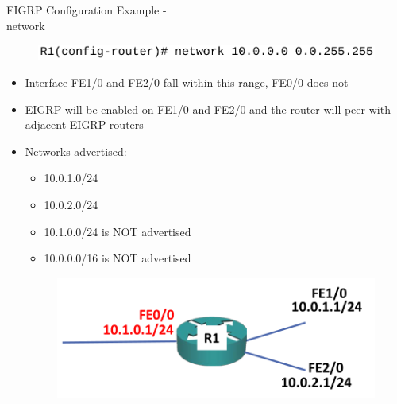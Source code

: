 \documentclass[pdflatex,compress,mathserif]{beamer}
\begin{document}
\begin{frame}{EIGRP Configuration Example -\\ network}
	\begin{figure}
		\centering
		\includegraphics[width=\linewidth]{img/img16}
	\end{figure}
	\begin{itemize}
		\item Interface FE1/0 and FE2/0 fall within this range, FE0/0 does not
		\item EIGRP will be enabled on FE1/0 and FE2/0 and the router will peer with
adjacent EIGRP routers
		\item Networks advertised:
		\begin{multicols}{2}
			\begin{itemize}
				\item 10.0.1.0/24
				\item 10.0.2.0/24
				\item 10.1.0.0/24 is NOT advertised
				\item 10.0.0.0/16 is NOT advertised
			\end{itemize}
			\columnbreak
			\begin{figure}
				\centering
				\includegraphics[width=\linewidth]{img/img17}
			\end{figure}
		\end{multicols}
	\end{itemize}
\end{frame}
\end{document}
